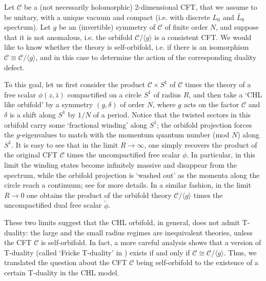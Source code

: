 \documentclass[11pt,reqno]{article}
\newcommand{\calC}{\mathcal{C}}
\begin{document}
Let $\calC$ be a (not necessarily holomorphic) 2-dimensional CFT, that we assume to be unitary, with a unique vacuum and compact (i.e. with discrete $L_0$ and $\bar L_0$ spectrum). Let $g$ be an (invertible) symmetry of $\calC$ of finite order $N$, and suppose that it is not anomalous, i.e. the orbifold $\calC/\langle g\rangle$ is a consistent CFT. We would like to know whether the theory is self-orbifold, i.e. if there is an isomorphism $\calC \cong \calC/\langle g\rangle$, and in this case to determine the action of the corresponding duality defect.

To this goal, let us first consider the product $\calC\times S^1$ of $\calC$ times the theory of a free scalar $\phi(z,\bar z)$ compactified on a circle $S^1$ of radius $R$, and then take a `CHL like orbifold' \cite{Chaudhuri:1995fk} by a symmetry $(g,\delta)$ of order $N$, where $g$ acts on the factor $\calC$ and $\delta$ is a shift along $S^1$ by $1/N$ of a period. Notice that the twisted sectors in this orbifold carry some `fractional winding' along $S^1$; the orbifold projection forces the $g$-eigenvalues to match with the momentum quantum number (mod $N$) along $S^1$. It is easy to see that in the limit $R\to \infty$, one simply recovers the product of the original CFT $\calC$ times the uncompactified free scalar $\phi$. In particular,  in this limit the winding states become infinitely massive and disappear from the spectrum, while the orbifold projection is `washed out' as the momenta along the circle reach a continuum; see \cite{Persson:2015jka} for more details. In a similar fashion, in the limit $R\to 0$ one obtains the product of the orbifold theory $\calC/\langle g\rangle$ times the uncompactified dual free scalar $\tilde \phi$.

These two limits suggest that the CHL orbifold, in general, does not admit T-duality: the large and the small radius regimes are inequivalent theories, unless the CFT $\calC$ is self-orbifold. In fact, a more careful analysis shows that a version of T-duality (called `Fricke  T-duality' in \cite{Persson:2015jka}) exists if and only if $\calC\cong \calC/\langle g\rangle$. Thus, we translated the question about the CFT $\calC$ being self-orbifold to the existence of a certain T-duality in the CHL model.
\end{document}
